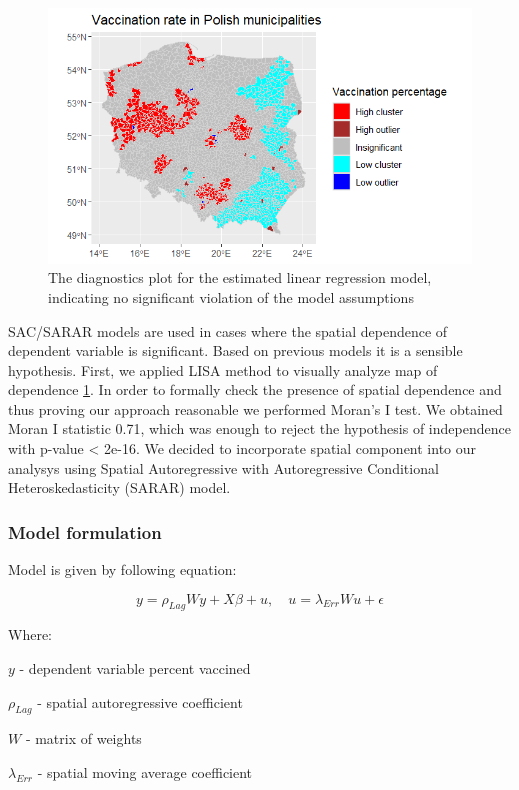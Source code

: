 \documentclass[a4paper,12pt]{article} %
\begin{document}
\begin{figure}[htp]
    \centering
    \includegraphics[width=1\textwidth]{assets/vaccination_rate.png}
    \caption{The diagnostics plot for the estimated linear regression model, indicating no significant violation of the model assumptions}
    \label{fig:LISA method}
\end{figure}
SAC/SARAR models are used in cases where the spatial dependence of dependent variable is  significant. Based on previous models it is a sensible hypothesis. First, we applied LISA method to visually analyze map of dependence \ref{fig:LISA method}. In order to formally check the presence of spatial dependence and thus proving our approach reasonable we performed Moran's I test. We obtained Moran I statistic 0.71, which was enough to reject the hypothesis of independence with p-value < 2e-16.  We decided to incorporate spatial component into our analysys using Spatial Autoregressive with Autoregressive Conditional Heteroskedasticity (SARAR) model. \cite{bivand2013applied}

\subsubsection{Model formulation}

Model is given by following equation:

\[y = \rho_{Lag}W y + X\beta + u, \quad u = \lambda _{Err}Wu + \epsilon\]

\newpage
\noindent Where:

$y$ - dependent variable percent vaccined

$\rho_{Lag}$ - spatial autoregressive coefficient

$W$ - matrix of weights

$ \lambda _{Err}$ - spatial moving average coefficient
\end{document}
